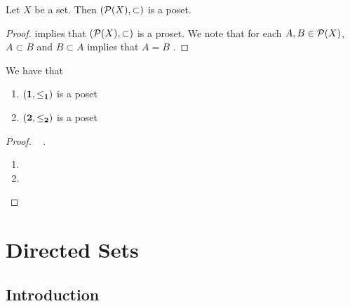 \documentclass{book}
\begin{document}
	\begin{ex} 
		Let $X$ be a set. Then $(\mathcal{P}(X), \subset)$ is a poset.
	\end{ex}
	
	\begin{proof}
		 implies that $(\mathcal{P}(X), \subset)$ is a proset. We note that for each $A,B \in \mathcal{P}(X)$, $A \subset B$ and $B \subset A$ implies that $A = B$ . 
	\end{proof}
	
	\begin{ex} 
		We have that 
		\begin{enumerate}
			\item $(\mathbf{1}, \leq_{\mathbf{1}})$ is a poset
			\item $(\mathbf{2}, \leq_{\mathbf{2}})$ is a poset
		\end{enumerate}
	\end{ex}
	
	\begin{proof}\   .
		\begin{enumerate}
			\item 
			\item 
		\end{enumerate}
	\end{proof}
	
	
	
	
	
	
	
	
	
	
	
	
	
	
	
	
	
	
	
	
	
	
	
	
	
	
	
	
	
	
	
	
	
	
	
	
	\newpage
	\chapter{Directed Sets}
	
	\section{Introduction}
	
\end{document}
